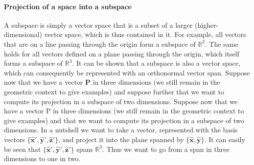 \paragraph{Projection of a space into a subspace}
A subspace is simply a vector space that is a subset of a larger (higher-dimensional) vector space, which is thus contained in it.\newline
For example, all vectors that are on a line passing through the origin form a subspace of $\mathbb{R}^2$. The same holds for all vectors defined on a plane passing through the origin, which itself forms a subspace of $\mathbb{R}^3$.\newline
It can be shown that a subspace is also a vector space, which can consequently be represented with an orthonormal vector span.\newline
Suppose now that we have a vector $\mathbf{P}$ in three dimensions (we still remain in the geometric context to give examples) and suppose further that we want to compute its projection in a subspace of two dimensions.\newline 
Suppose now that we have a vector P in three dimensions (we still remain in the geometric context
to give examples) and that we want to compute its projection in a subspace of two
dimensions.
In a nutshell we want to take a vector, represented with the basis vectors $\{\hat{\mathbf{x}}', \hat{\mathbf{y}}', \hat{\mathbf{z}}'\}$, and project it into the plane spanned by $\{\hat{\mathbf{x}}, \hat{\mathbf{y}}\}$.\newline
It can easily be seen that $\{\hat{\mathbf{x}}', \hat{\mathbf{y}}', \hat{\mathbf{z}}'\}$ spans $\mathbb{R}^3$. Thus we want to go from a span in three dimensions to one in two. 
\begin{figure}[!h]
\centering
{}
\caption{ \label{fig:projection_example}}
\end{figure}
